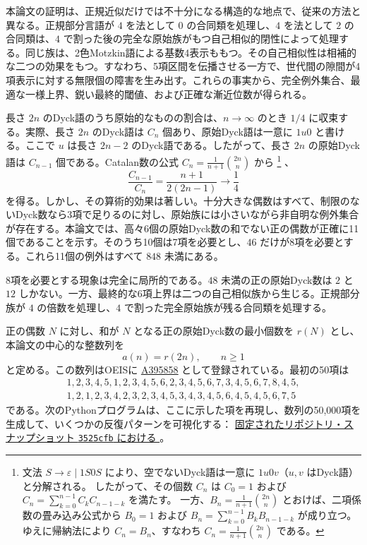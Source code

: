\documentclass[12pt]{ltjsarticle}
\theoremstyle{plain}
\theoremstyle{definition}
\theoremstyle{plain}
\newcommand{\seqnum}[1]{\href{https://oeis.org/#1}{\textrm{\underline{#1}}}}
\begin{document}
本論文の証明は、正規近似だけでは不十分になる構造的な地点で、従来の方法と異なる。正規部分言語が $4$ を法として $0$ の合同類を処理し、$4$ を法として $2$ の合同類は、$4$ で割った後の完全な原始族がもつ自己相似的閉性によって処理する。同じ族は、2色Motzkin語による基数4表示ももつ。その自己相似性は相補的な二つの効果をもつ。すなわち、5項区間を伝播させる一方で、世代間の隙間が4項表示に対する無限個の障害を生み出す。これらの事実から、完全例外集合、最適な一様上界、鋭い最終的閾値、および正確な漸近位数が得られる。

長さ $2n$ のDyck語のうち原始的なものの割合は、$n\to\infty$ のとき $1/4$ に収束する。実際、長さ $2n$ のDyck語は $C_n$ 個あり、原始Dyck語は一意に $1u0$ と書ける。ここで $u$ は長さ $2n-2$ のDyck語である。したがって、長さ $2n$ の原始Dyck語は $C_{n-1}$ 個である。Catalan数の公式
$C_n=\frac1{n+1}\binom{2n}{n}$
から
\footnote{文法 $S\to\varepsilon\mid 1S0S$ により、空でないDyck語は一意に $1u0v$（$u,v$ はDyck語）と分解される。 したがって、その個数 $C_n$ は $C_0=1$ および $C_n=\sum_{k=0}^{n-1}C_kC_{n-1-k}$ を満たす。 一方、$B_n=\frac{1}{n+1}\binom{2n}{n}$ とおけば、二項係数の畳み込み公式から $B_0=1$ および $B_n=\sum_{k=0}^{n-1}B_kB_{n-1-k}$ が成り立つ。 ゆえに帰納法により $C_n=B_n$、すなわち $C_n=\frac{1}{n+1}\binom{2n}{n}$ である。}
、
\[
 \frac{C_{n-1}}{C_n}=\frac{n+1}{2(2n-1)}\longrightarrow\frac14
\]
を得る。しかし、その算術的効果は著しい。十分大きな偶数はすべて、制限のないDyck数なら3項で足りるのに対し、原始族には小さいながら非自明な例外集合が存在する。本論文では、高々6個の原始Dyck数の和でない正の偶数が正確に11個であることを示す。そのうち10個は7項を必要とし、$46$ だけが8項を必要とする。これら11個の例外はすべて $848$ 未満にある。

8項を必要とする現象は完全に局所的である。$48$ 未満の正の原始Dyck数は $2$ と $12$ しかない。一方、最終的な6項上界は二つの自己相似族から生じる。正規部分族が $4$ の倍数を処理し、$4$ で割った完全原始族が残る合同類を処理する。

正の偶数 $N$ に対し、和が $N$ となる正の原始Dyck数の最小個数を $r(N)$ とし、本論文の中心的な整数列を
\[
        a(n)=r(2n),\qquad n\geq1
\]
と定める。この数列はOEISに \seqnum{A395858} \cite{OEIS-A395858} として登録されている。最初の50項は
\[
\begin{gathered}
1,2,3,4,5,1,2,3,4,5,6,2,3,4,5,6,7,3,4,5,6,7,8,4,5,\\
1,2,1,2,3,4,2,3,2,3,4,5,3,4,3,4,5,6,4,5,4,5,6,7,5
\end{gathered}
\]
である。次のPythonプログラムは、ここに示した項を再現し、数列の50,000項を生成して、いくつかの反復パターンを可視化する：
\href{https://github.com/growupkuriyama-hub/lean_cfg_project/blob/3525cfb/LeanCfgProject/PrimDyck/A395858.py}{固定されたリポジトリ・スナップショット \texttt{3525cfb} における }。
\end{document}
